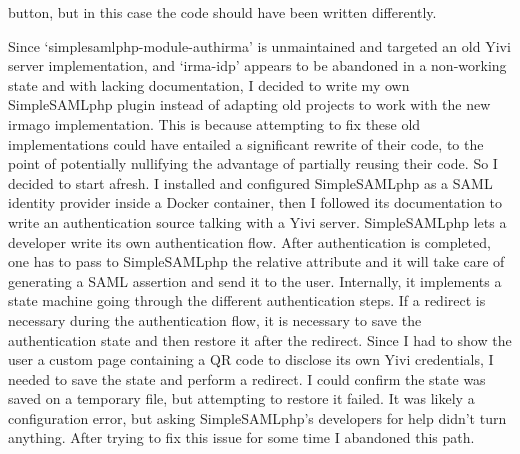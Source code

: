 \documentclass{report}
\begin{document}
button, but in this case the code should have been written differently. \par
Since \enquote*{simplesamlphp-module-authirma} is unmaintained and targeted an old Yivi server implementation, and \enquote*{irma-idp} appears to be abandoned in a non-working
state and with lacking documentation, I decided to write my own SimpleSAMLphp plugin instead of adapting old projects to work with the new irmago implementation. This is because
attempting to fix these old implementations could have entailed a significant rewrite of their code, to the point of potentially nullifying the advantage of partially reusing their
code. So I decided to start afresh. I installed and configured SimpleSAMLphp \cite{simplesamlphp-docs} as a SAML identity provider \cite{sstc-saml-core-errata-2.0-wd-07} inside a
Docker container, then I followed its documentation to write an authentication source talking with a Yivi server. SimpleSAMLphp lets a developer write its own authentication
flow. After authentication is completed, one has to pass to SimpleSAMLphp the relative attribute and it will take care of generating a SAML assertion and send it to the user.
Internally, it implements a state machine going through the different authentication steps. If a redirect is necessary during the authentication flow, it is necessary to save the
authentication state and then restore it after the redirect.  Since I had to show the user a custom page containing a QR code to disclose its own Yivi credentials, I needed to save
the state and perform a redirect. I could confirm the state was saved on a temporary file, but attempting to restore it failed. It was likely a configuration error, but asking
SimpleSAMLphp's developers for help didn't turn anything. After trying to fix this issue for some time I abandoned this path.
\end{document}
